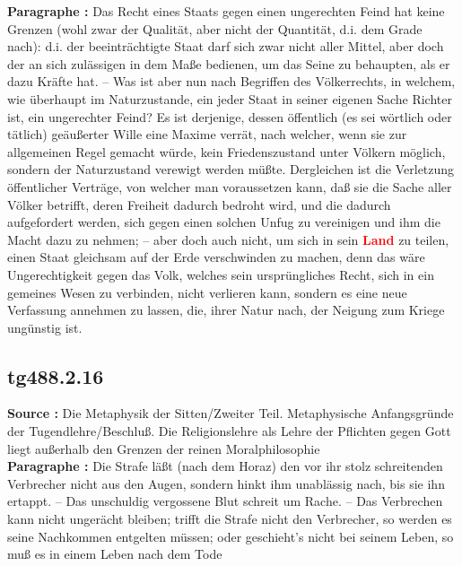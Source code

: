 \documentclass[a4paper,12pt,twoside]{book}
\newcommand{\match}[1]{\textcolor{red}{\textbf{#1}}}
\begin{document}
	\textbf{Paragraphe : }Das Recht eines Staats gegen einen ungerechten Feind hat keine Grenzen (wohl zwar der Qualität, aber nicht der Quantität, d.i. dem Grade nach): d.i. der beeinträchtigte Staat darf sich zwar nicht aller Mittel, aber doch der an sich zulässigen in dem Maße bedienen, um das Seine zu behaupten, als er dazu Kräfte hat. – Was ist aber nun nach Begriffen des Völkerrechts, in welchem, wie überhaupt im Naturzustande, ein jeder Staat in seiner eigenen Sache Richter ist, ein ungerechter Feind? Es ist derjenige, dessen öffentlich (es sei wörtlich oder tätlich) geäußerter Wille eine Maxime verrät, nach welcher, wenn sie zur allgemeinen Regel gemacht würde, kein Friedenszustand unter Völkern möglich, sondern der Naturzustand verewigt werden müßte. Dergleichen ist die Verletzung öffentlicher Verträge, von welcher man voraussetzen kann, daß sie die Sache aller Völker betrifft, deren Freiheit dadurch bedroht wird, und die dadurch aufgefordert werden, sich gegen einen solchen Unfug zu vereinigen und ihm die Macht dazu zu nehmen; – aber doch auch nicht, um sich in sein \match{Land} zu teilen, einen Staat gleichsam auf der Erde verschwinden zu machen, denn das wäre Ungerechtigkeit gegen das Volk, welches sein ursprüngliches Recht, sich in ein gemeines Wesen zu verbinden, nicht verlieren kann, sondern es eine neue Verfassung annehmen zu lassen, die, ihrer Natur nach, der Neigung zum Kriege ungünstig ist. 
	
	\subsection*{tg488.2.16} 
	\textbf{Source : }Die Metaphysik der Sitten/Zweiter Teil. Metaphysische Anfangsgründe der Tugendlehre/Beschluß. Die Religionslehre als Lehre der Pflichten gegen Gott liegt außerhalb den Grenzen der reinen Moralphilosophie\\  
	
	\textbf{Paragraphe : }Die Strafe läßt (nach dem Horaz) den vor ihr stolz schreitenden Verbrecher nicht aus den Augen, sondern hinkt ihm unablässig nach, bis sie ihn ertappt. – Das unschuldig vergossene Blut schreit um Rache. – Das Verbrechen kann nicht ungerächt bleiben; trifft die Strafe nicht den Verbrecher, so werden es seine Nachkommen entgelten müssen; oder geschieht's nicht bei seinem Leben, so muß es in einem Leben nach dem Tode
	
\end{document}
